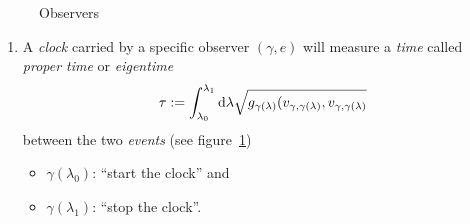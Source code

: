\documentclass[11pt, a4paper, twocolumn]{article} %
\begin{document}
    \begin{figure}[tbh]
        \centering\def\svgwidth{\columnwidth}
        
        \caption{Observers}
        \label{fig:observers}
    \end{figure}

    \begin{enumerate}[resume, label=(\subscript{P}{{\arabic*}})]
        \item A \textit{clock} carried by a specific observer $(\gamma, e)$ will measure a
            \textit{time} called \textit{proper time} or \textit{eigentime}
            \begin{equation}
                \tau := \int_{\lambda_0}^{\lambda_1} \operatorname{d\!} \lambda \sqrt{g_{\gamma(\lambda)}(v_{\gamma, \gamma(\lambda)}, v_{\gamma, \gamma(\lambda)}}
            \end{equation}
            between the two \textit{events} (see figure~\ref{fig:observers})
            \begin{itemize}
                \item $\gamma(\lambda_0)$: ``start the clock'' and
                \item $\gamma(\lambda_1)$: ``stop the clock''.
            \end{itemize}
            \label{item:clock}
    \end{enumerate}
\end{document}
